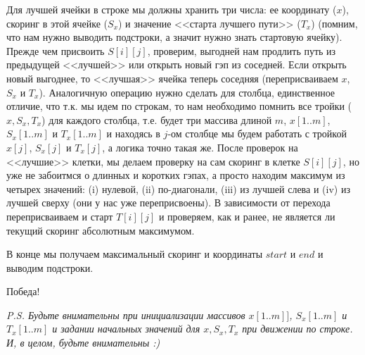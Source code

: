 \documentclass[letterpaper, 11pt]{article}
\begin{document}
Для лучшей ячейки в строке мы должны хранить три числа: ее координату ($x$), скоринг в этой ячейке ($S_x$) и значение <<старта лучшего пути>> ($T_x$) (помним, что нам нужно выводить подстроки, а значит нужно знать стартовую ячейку). Прежде чем присвоить $S[i][j]$, проверим, выгодней нам продлить путь из предыдущей <<лучшей>> или открыть новый гэп из соседней. Если открыть новый выгоднее, то <<лучшая>> ячейка теперь соседняя (переприсваиваем $x$, $S_x$ и $T_x$). Аналогичную операцию нужно сделать для столбца, единственное отличие, что т.к. мы идем по строкам, то нам необходимо помнить все тройки ($x, S_x, T_x$) для каждого столбца, т.е. будет три массива длиной $m$, $x[1..m]$, $S_x[1..m]$ и $T_x[1..m]$ и находясь в $j$-ом столбце мы будем работать с тройкой $x[j]$, $S_x[j]$ и $T_x[j]$, а логика точно такая же. После проверок на <<лучшие>> клетки, мы делаем проверку на сам скоринг в клетке $S[i][j]$, но уже не забоитмся о длинных и коротких гэпах, а просто находим максимум из четырех значений: (i) нулевой, (ii) по-диагонали, (iii) из лучшей слева и (iv) из лучшей сверху (они у нас уже переприсвоены). В зависимости от перехода переприсваиваем и старт $T[i][j]$ и проверяем, как и ранее, не является ли текущий скоринг абсолютным максимумом.

В конце мы получаем максимальный скоринг и координаты $start$ и $end$ и выводим подстроки.

Победа!

\textit{P.S. Будьте внимательны при инициализации массивов $x[1..m]]$, $S_x[1..m]$ и $T_x[1..m]$ и задании начальных значений для $x, S_x, T_x$ при движении по строке. И, в целом, будьте внимательны :)}
\end{document}
